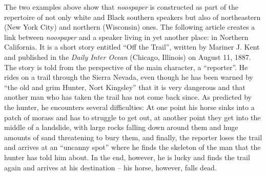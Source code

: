 The two examples above show that \emph{noospaper} is constructed as part of the repertoire of not only white and Black southern speakers but also of northeastern (New York City) and northern (Wisconsin) ones. The following article creates a link between \emph{noospaper} and a speaker living in yet another place: in Northern California. It is a short story entitled “Off the Trail”, written by Mariner J. Kent and published in the \emph{Daily Inter Ocean} (Chicago, Illinois) on August 11, 1887. The story is told from the perspective of the main character, a “reporter”. He rides on a trail through the Sierra Nevada, even though he has been warned by “the old and grim Hunter, Nort Kingsley” that it is very dangerous and that another man who has taken the trail has not come back since. As predicted by the hunter, he encounters several difficulties: At one point his horse sinks into a patch of morass and has to struggle to get out, at another point they get into the middle of a landslide, with large rocks falling down around them and huge amounts of sand threatening to bury them, and finally, the reporter loses the trail and arrives at an “uncanny spot” where he finds the skeleton of the man that the hunter has told him about. In the end, however, he is lucky and finds the trail again and arrives at his destination – his horse, however, falls dead.

